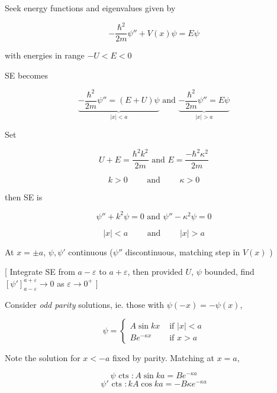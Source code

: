 \documentclass[a4paper]{article}
\begin{document}
	\begin{center}
\end{center}

Seek energy functions and eigenvalues given by

\[ -\frac{\hbar^{2}}{2m} \psi''  + V(x) \psi = E \psi \]

with energies in range $ -U < E < 0 $

SE becomes 

\[ \underbrace{-\frac{\hbar^{2}}{2m} \psi'' = (E+U) \psi}_{| x | < a} \text{ and } \underbrace{-\frac{\hbar^{2}}{2m} \psi'' = E \psi}_{| x | > a}  \]

Set 

\[ U + E = \frac{\hbar^{2}k^{2}}{2m} \text{ and } E = \frac{-\hbar^{2}\kappa^{2}}{2m}   \]

\[ k > 0 \qquad \text{ and } \qquad \kappa > 0 \]

then SE is 

\[ \psi''  + k^{2} \psi = 0 \text{ and } \psi'' - \kappa^{2} \psi = 0 \]

\[ | x | < a \qquad \text{ and } \qquad | x | > a \]

At $ x = \pm a $, $ \psi,\psi' $ continuous ($ \psi'' $ discontinuous, matching step in $ V(x) $ )

[ Integrate SE from $ a - \varepsilon $ to $ a + \varepsilon $, then provided $ U $, $ \psi $ bounded, find $ [\psi']_{a - \varepsilon}^{a + \varepsilon} \to 0 $ as $ \varepsilon \to 0^{+} $ ]

Consider \emph{odd parity} solutions, ie. those with $ \psi(-x) = -\psi(x) $,

\[ \psi = \begin{cases} A \sin k x  & \text{ if } | x | < a \\ Be^{-\kappa x} & \text{ if } x > a \end{cases} \]

Note the solution for $ x < -a $ fixed by parity. Matching at $ x = a $,

\[ \psi \text{ cts }: A \sin k a = B e^{-\kappa a} \]
\[ \psi' \text{ cts }: k A \cos k a = - B \kappa e^{-\kappa a} \]
\end{document}
